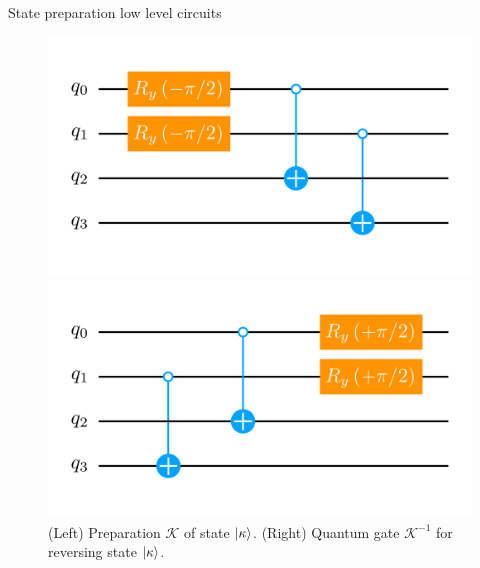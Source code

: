 \documentclass[9pt, aspectratio=169]{beamer}
\begin{document}
\begin{frame}[allowframebreaks]{State preparation low level circuits}
	\begin{figure}[!p]
		\centering
		\begin{minipage}[c]{.45\linewidth}
			\centering
			\includegraphics[width=\linewidth]{Figures/NJL1-model-solving/ansatz-implementation-base-state-preparation-kappa}
		\end{minipage}
	  \hspace{.025\linewidth}
		\begin{minipage}[c]{.45\linewidth}
			\centering
			\includegraphics[width=\linewidth]{Figures/NJL1-model-solving/ansatz-implementation-base-state-reversing-kappa}
		\end{minipage}
		\caption{(Left) Preparation $\mathcal{K}$ of state $\ket{\kappa}$. (Right) Quantum gate $\mathcal{K}^{-1}$ for reversing state $\ket{\kappa}$.}
	\end{figure}


\end{frame}

\end{document}
